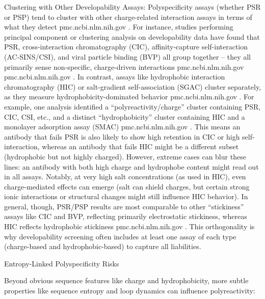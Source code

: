 Clustering with Other Developability Assays: Polyspecificity assays (whether PSR or PSP) tend to cluster with other charge-related interaction assays in terms of what they detect
pmc.ncbi.nlm.nih.gov
. For instance, studies performing principal component or clustering analysis on developability data have found that PSR, cross-interaction chromatography (CIC), affinity-capture self-interaction (AC-SINS/CSI), and viral particle binding (BVP) all group together – they all primarily sense non-specific, charge-driven interactions
pmc.ncbi.nlm.nih.gov
pmc.ncbi.nlm.nih.gov
. In contrast, assays like hydrophobic interaction chromatography (HIC) or salt-gradient self-association (SGAC) cluster separately, as they measure hydrophobicity-dominated behavior
pmc.ncbi.nlm.nih.gov
. For example, one analysis identified a “polyreactivity/charge” cluster containing PSR, CIC, CSI, etc., and a distinct “hydrophobicity” cluster containing HIC and a monolayer adsorption assay (SMAC)
pmc.ncbi.nlm.nih.gov
. This means an antibody that fails PSR is also likely to show high retention in CIC or high self-interaction, whereas an antibody that fails HIC might be a different subset (hydrophobic but not highly charged). However, extreme cases can blur these lines: an antibody with both high charge and hydrophobe content might read out in all assays. Notably, at very high salt concentrations (as used in HIC), even charge-mediated effects can emerge (salt can shield charges, but certain strong ionic interactions or structural changes might still influence HIC behavior). In general, though, PSR/PSP results are most comparable to other “stickiness” assays like CIC and BVP, reflecting primarily electrostatic stickiness, whereas HIC reflects hydrophobic stickiness
pmc.ncbi.nlm.nih.gov
. This orthogonality is why developability screening often includes at least one assay of each type (charge-based and hydrophobic-based) to capture all liabilities.

Entropy-Linked Polyspecificity Risks

Beyond obvious sequence features like charge and hydrophobicity, more subtle properties like sequence entropy and loop dynamics can influence polyreactivity:

